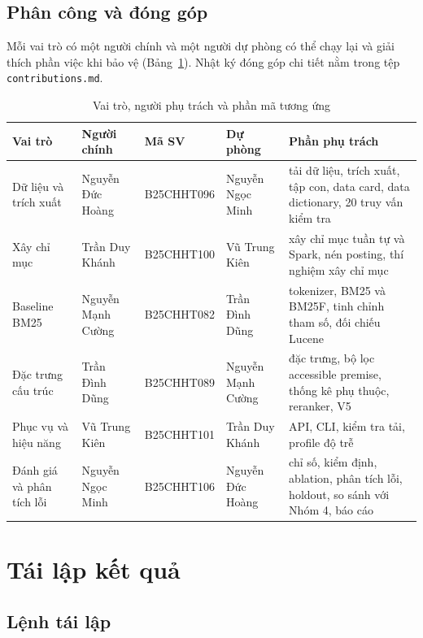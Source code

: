\documentclass[11pt,a4paper,oneside]{report}
\newcommand{\code}[1]{\texttt{#1}}
\begin{document}
\section{Phân công và đóng góp}\label{app:contrib}

Mỗi vai trò có một người chính và một người dự phòng có thể chạy lại và giải thích phần việc khi bảo vệ
(Bảng~\ref{tab:roles}). Nhật ký đóng góp chi tiết nằm trong tệp \code{contributions.md}.

\begin{table}[H]
\centering
\caption{Vai trò, người phụ trách và phần mã tương ứng}\label{tab:roles}
\small
\begin{tabularx}{\linewidth}{@{}>{\raggedright\arraybackslash}p{2.5cm}>{\raggedright\arraybackslash}p{2.8cm}l>{\raggedright\arraybackslash}p{2.8cm}>{\raggedright\arraybackslash}X@{}}
\toprule
Vai trò & Người chính & Mã SV & Dự phòng & Phần phụ trách \\
\midrule
Dữ liệu và trích xuất & Nguyễn Đức Hoàng & B25CHHT096 & Nguyễn Ngọc Minh & tải dữ liệu, trích xuất, tập con, data card, data dictionary, 20 truy vấn kiểm tra \\
Xây chỉ mục & Trần Duy Khánh & B25CHHT100 & Vũ Trung Kiên & xây chỉ mục tuần tự và Spark, nén posting, thí nghiệm xây chỉ mục \\
Baseline BM25 & Nguyễn Mạnh Cường & B25CHHT082 & Trần Đình Dũng & tokenizer, BM25 và BM25F, tinh chỉnh tham số, đối chiếu Lucene \\
Đặc trưng cấu trúc & Trần Đình Dũng & B25CHHT089 & Nguyễn Mạnh Cường & đặc trưng, bộ lọc accessible premise, thống kê phụ thuộc, reranker, V5 \\
Phục vụ và hiệu năng & Vũ Trung Kiên & B25CHHT101 & Trần Duy Khánh & API, CLI, kiểm tra tải, profile độ trễ \\
Đánh giá và phân tích lỗi & Nguyễn Ngọc Minh & B25CHHT106 & Nguyễn Đức Hoàng & chỉ số, kiểm định, ablation, phân tích lỗi, holdout, so sánh với Nhóm 4, báo cáo \\
\bottomrule
\end{tabularx}
\end{table}

\chapter{Tái lập kết quả}\label{app:reproduce}

\section{Lệnh tái lập}\label{app:repro}
\end{document}
